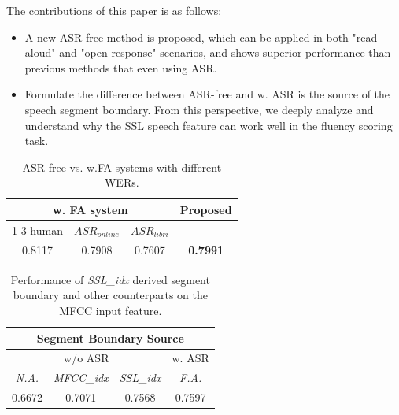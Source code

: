 The contributions of this paper is as follows:
\begin{itemize}
    \item A new ASR-free method is proposed, which can be applied in both "read aloud" and "open response" scenarios, and shows superior performance than previous methods that even using ASR. 
    \item Formulate the difference between ASR-free and w. ASR is the source of the speech segment boundary. From this perspective, we deeply analyze and understand why the SSL speech feature can work well in the fluency scoring task.  
\end{itemize}

\begin{table}[t!]
\centering
\small
\begin{tabular}{ccc|c}
\toprule
\multicolumn{3}{c|}{w. FA system}       & \multirow{2}{*}{Proposed} \\ \cline{1-3}
human  & $ASR_{online}$ & $ASR_{libri}$ &                           \\ \midrule
0.8117 & 0.7908         & 0.7607        & \textbf{0.7991}                    \\ \bottomrule
\end{tabular}
\caption{ASR-free vs. w.FA systems with different WERs.}
\label{tab:asr_error_effect}
\end{table}

\begin{table}[t!]
\centering
\caption{Performance of \textit{SSL\_idx} derived segment boundary and other counterparts on the MFCC input feature.}
\small
\begin{tabular}{cccc}
\toprule
\multicolumn{4}{c}{Segment Boundary Source}                                  \\ \hline
\multicolumn{3}{c|}{w/o ASR}                     & w. ASR           \\ \hline
\textit{N.A.}   & \textit{MFCC\_idx} & \multicolumn{1}{c|}{\textit{SSL\_idx}} & \textit{F.A.}\\ \hline
0.6672 & 0.7071   & \multicolumn{1}{c|}{0.7568}  & 0.7597           \\ \bottomrule
\end{tabular}

\label{tab:ssl_idx_on_mfcc}
\vspace{-3mm}
\end{table}

